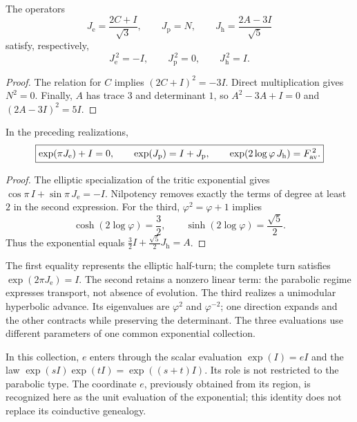 \begin{proposition}
\label{euler-trit-generadores}
The operators
\[
 J_{\mathrm e}=\frac{2C+I}{\sqrt3},\qquad
 J_{\mathrm p}=N,\qquad
 J_{\mathrm h}=\frac{2A-3I}{\sqrt5}
\]
satisfy, respectively,
\[
 J_{\mathrm e}^{\,2}=-I,\qquad
 J_{\mathrm p}^{\,2}=0,\qquad
 J_{\mathrm h}^{\,2}=I.
\]
\end{proposition}
\begin{proof}
The relation for \(C\) implies \((2C+I)^2=-3I\).
Direct multiplication gives \(N^2=0\).
Finally, \(A\) has trace \(3\) and determinant \(1\), so
\(A^2-3A+I=0\) and \((2A-3I)^2=5I\).
\end{proof}

\begin{proposition}
\label{euler-trit-evaluaciones}
In the preceding realizations,
\begin{equation}
 \boxed{
 \exp(\pi J_{\mathrm e})+I=0,\qquad
 \exp(J_{\mathrm p})=I+J_{\mathrm p},\qquad
 \exp(2\log\varphi\,J_{\mathrm h})=F_{\rm av}^{\,2}.}
 \label{euler-trit-tres-evaluaciones}
\end{equation}
\end{proposition}
\begin{proof}
The elliptic specialization of the tritic exponential gives
\(\cos\pi\,I+\sin\pi\,J_{\mathrm e}=-I\).
Nilpotency removes exactly the terms of degree at least \(2\)
in the second expression. For the third, \(\varphi^2=\varphi+1\) implies
\[
 \cosh(2\log\varphi)=\frac32,\qquad
 \sinh(2\log\varphi)=\frac{\sqrt5}{2}.
\]
Thus the exponential equals
\(\frac32I+\frac{\sqrt5}{2}J_{\mathrm h}=A\).
\end{proof}

The first equality represents the elliptic half-turn; the complete turn
satisfies \(\exp(2\pi J_{\mathrm e})=I\). The second retains a
nonzero linear term: the parabolic regime expresses transport, not absence
of evolution. The third realizes a unimodular hyperbolic advance. Its
eigenvalues are \(\varphi^2\) and \(\varphi^{-2}\); one direction
expands and the other contracts while preserving the determinant. The
three evaluations use different parameters of one common exponential collection.

In this collection, \(e\) enters through the scalar evaluation
\(\exp(I)=eI\) and the law \(\exp(sI)\exp(tI)=\exp((s+t)I)\).
Its role is not restricted to the parabolic type. The coordinate \(e\),
previously obtained from its region, is recognized here as the unit
evaluation of the exponential; this identity does not replace its
coinductive genealogy.

